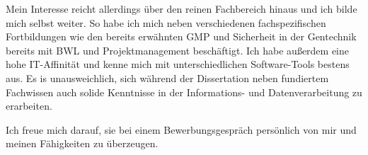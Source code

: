 Mein Interesse reicht allerdings über den reinen Fachbereich hinaus und ich bilde mich selbst weiter. So habe ich mich neben verschiedenen fachspezifischen Fortbildungen wie den bereits erwähnten GMP und Sicherheit in der Gentechnik bereits mit BWL und Projektmanagement beschäftigt. Ich habe außerdem eine hohe IT-Affinität und kenne mich mit unterschiedlichen Software-Tools bestens aus. Es is unausweichlich, sich während der Dissertation neben fundiertem Fachwissen auch solide Kenntnisse in der Informations- und Datenverarbeitung zu erarbeiten.\par %

Ich freue mich darauf, sie bei einem Bewerbungsgespräch persönlich von mir und meinen Fähigkeiten zu überzeugen.\par\vspace{1em}




\makeletterclosing



